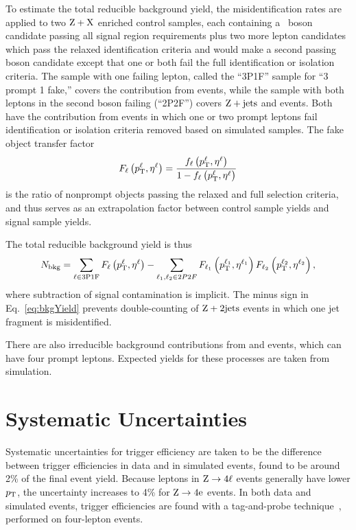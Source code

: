 To estimate the total reducible background yield, the misidentification rates are applied to two $\mathrm{Z}+\mathrm{X}$ enriched control samples, each containing a {\PZ}~boson candidate passing all signal region requirements plus two more lepton candidates which pass the relaxed identification criteria and would make a second passing {\PZ} boson candidate except that one or both fail the full identification or isolation criteria.
The sample with one failing lepton, called the ``3P1F'' sample for ``3 prompt 1 fake,'' covers the contribution from {\WZ} events, while the sample with both leptons in the second {\PZ} boson failing (``2P2F'') covers $\mathrm{Z}+\text{jets}$ and {\TTbar} events.
Both have the contribution from {\ZZ} events in which one or two prompt leptons fail identification or isolation criteria removed based on simulated samples.
The fake object transfer factor
\begin{equation}
  F_\ell\left(p_\mathrm{T}^\ell,\eta^\ell\right) = \frac{f_\ell\left(p_\mathrm{T}^\ell, \eta^\ell\right)}{1 - f_\ell\left(p_\mathrm{T}^\ell, \eta^\ell\right)}
\end{equation}
is the ratio of nonprompt objects passing the relaxed and full selection criteria, and thus serves as an extrapolation factor between control sample yields and signal sample yields.

The total reducible background yield is thus
\begin{equation}\label{eq:bkgYield}
  N_\text{bkg} = \sum_{\ell \in \text{3P1F}} F_\ell\left(p_\mathrm{T}^\ell,\eta^\ell\right) - \sum_{\ell_1,\ell_2 \in 2P2F} F_{\ell_1}\left(p_\mathrm{T}^{\ell_1},\eta^{\ell_1}\right)F_{\ell_2}\left(p_\mathrm{T}^{\ell_2},\eta^{\ell_2}\right),
\end{equation}
where subtraction of signal contamination is implicit.
The minus sign in Eq.~\ref{eq:bkgYield} prevents double-counting of $\mathrm{Z}+2\text{jets}$ events in which one jet fragment is misidentified.

There are also irreducible background contributions from {\TTZ} and {\WWZ} events, which can have four prompt leptons.
Expected yields for these processes are taken from simulation.



\section{Systematic Uncertainties}

Systematic uncertainties for trigger efficiency are taken to be the difference between trigger efficiencies in data and in simulated events, found to be around 2\% of the final event yield.
Because leptons in $\mathrm{Z} \to 4\ell$ events generally have lower $p_\mathrm{T}$, the uncertainty increases to 4\% for $\mathrm{Z} \to 4\mathrm{e}$ events.
In both data and simulated events, trigger efficiencies are found with a tag-and-probe technique~\cite{CMS:2011aa}, performed on four-lepton events.

